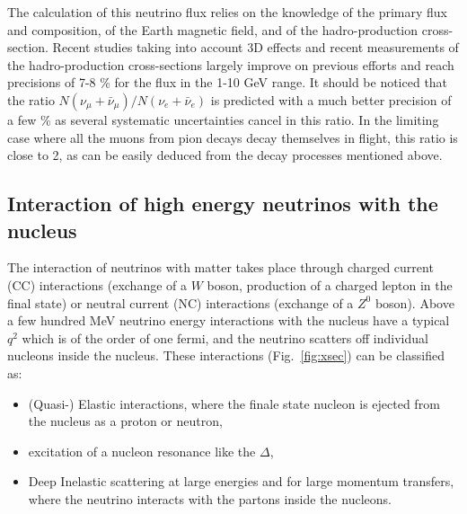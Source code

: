 The calculation of this neutrino flux \cite{Gaisser:2002jj} relies on the knowledge of the primary flux and composition, of the Earth magnetic field, and of the hadro-production cross-section. Recent studies \cite{PhysRevD.83.123001,Barr:2004br,Battistoni:2002ew} taking into account 3D effects and recent measurements of the hadro-production cross-sections largely improve on previous efforts and reach precisions of 7-8 \% for the flux in the 1-10 GeV range. It should be noticed that the ratio $N(\nu_\mu + \bar{\nu}_\mu)/N(\nu_e + \bar{\nu}_e)$ is predicted with a much better precision of a few \% as several systematic uncertainties cancel in this ratio. In the limiting case where all the muons from pion decays decay themselves in flight, this ratio is close to 2, as can be easily deduced from the decay processes mentioned above.


\subsection{Interaction of high energy neutrinos with the nucleus}

The interaction of neutrinos with matter takes place through charged current (CC) interactions (exchange of a $W$ boson, production of a charged lepton in the final state) or neutral current (NC) interactions (exchange of a $Z^0$ boson). 
Above a few hundred MeV neutrino energy interactions with the nucleus have a typical $q^2$ which is of the order of one fermi, and the neutrino scatters off individual nucleons inside the nucleus. These interactions (Fig.~\ref{fig:xsec}) can be classified as:
\begin{itemize}
  \item (Quasi-) Elastic interactions, where the finale state nucleon is ejected from the nucleus as a proton or neutron, 
  \item excitation of a nucleon resonance like the $\Delta$,
  \item Deep Inelastic scattering at large energies and for large momentum transfers, where the neutrino interacts with the partons inside the nucleons.
  \end{itemize}  

